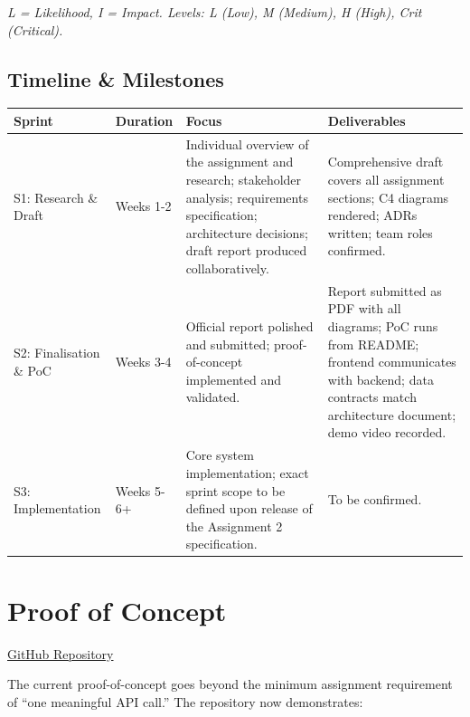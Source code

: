 \documentclass{article}
\begin{document}
\noindent\textit{L = Likelihood, I = Impact. Levels: L (Low), M (Medium), H (High), Crit (Critical).}









\newpage
\subsection{Timeline \& Milestones}
\noindent

{\small
\renewcommand{\arraystretch}{1.5} %
\begin{tabularx}{\textwidth}{|>{\hsize=0.7\hsize}X|>{\hsize=0.4\hsize}X|>{\hsize=1.4\hsize}X|>{\hsize=1.5\hsize}X|}
    \hline
    \rowcolor{tableBlue}
    \textbf{\color{white}Sprint} & 
    \textbf{\color{white}Duration} & 
    \textbf{\color{white}Focus} & 
    \textbf{\color{white}Deliverables} \\
    \hline
    S1: Research \& Draft & 
    Weeks 1-2 & 
    Individual overview of the assignment and research; stakeholder analysis; requirements specification; architecture decisions; draft report produced collaboratively. & 
    Comprehensive draft covers all assignment sections; C4 diagrams rendered; ADRs written; team roles confirmed. \\
    \hline
    S2: Finalisation \& PoC & 
    Weeks 3-4 & 
    Official report polished and submitted; proof-of-concept implemented and validated. & 
    Report submitted as PDF with all diagrams; PoC runs from README; frontend communicates with backend; data contracts match architecture document; demo video recorded. \\
    \hline
    S3: Implementation & 
    Weeks 5-6+ & 
    Core system implementation; exact sprint scope to be defined upon release of the Assignment 2 specification. & 
    To be confirmed. \\
    \hline
\end{tabularx}
}




\section{Proof of Concept}
\noindent\href{https://github.com/Tititooo/swe-1-doc-edit-AI}{GitHub Repository}

\vspace{8pt}
The current proof-of-concept goes beyond the minimum assignment requirement of ``one meaningful API call.'' The repository now demonstrates:
\end{document}
